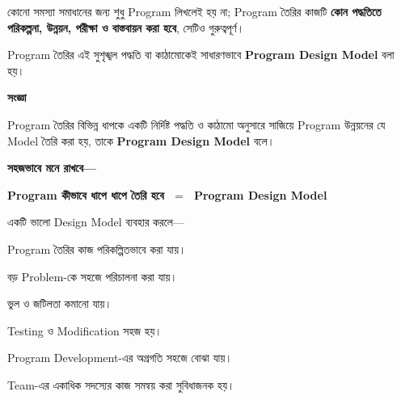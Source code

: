 
কোনো সমস্যা সমাধানের জন্য শুধু Program লিখলেই হয় না;
Program তৈরির কাজটি \textbf{কোন পদ্ধতিতে পরিকল্পনা, উন্নয়ন,
পরীক্ষা ও বাস্তবায়ন করা হবে}, সেটিও গুরুত্বপূর্ণ।

Program তৈরির এই সুশৃঙ্খল পদ্ধতি বা কাঠামোকেই সাধারণভাবে
\textbf{Program Design Model} বলা হয়।


\begin{definitionbox}

\textbf{\color{darkTeal}সংজ্ঞা}

Program তৈরির বিভিন্ন ধাপকে একটি নির্দিষ্ট পদ্ধতি ও কাঠামো
অনুসারে সাজিয়ে Program উন্নয়নের যে Model তৈরি করা হয়,
তাকে \textbf{Program Design Model} বলে।

\end{definitionbox}

\textbf{সহজভাবে মনে রাখবে—}

\begin{center}

\textbf{
Program কীভাবে ধাপে ধাপে তৈরি হবে
\(\;=\;\)
Program Design Model
}

\end{center}


একটি ভালো Design Model ব্যবহার করলে—

\begin{compacttwocolpoints}

\item Program তৈরির কাজ পরিকল্পিতভাবে করা যায়।

\item বড় Problem-কে সহজে পরিচালনা করা যায়।

\item ভুল ও জটিলতা কমানো যায়।

\item Testing ও Modification সহজ হয়।

\item Program Development-এর অগ্রগতি সহজে বোঝা যায়।

\item Team-এর একাধিক সদস্যের কাজ সমন্বয় করা সুবিধাজনক হয়।

\end{compacttwocolpoints}


